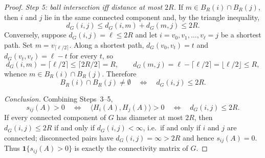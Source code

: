 \documentclass{article}
\begin{document}
\begin{proof}
\emph{Step 5: ball intersection iff distance at most $2R$.}
If $m\in B_R(i)\cap B_R(j)$, then $i$ and $j$ lie in the same connected
component and, by the triangle inequality,
\[
d_G(i,j)\leq d_G(i,m)+d_G(m,j)\leq 2R .
\]
Conversely, suppose $d_G(i,j)=\ell\leq 2R$ and let
$i=v_0,v_1,\dots,v_\ell=j$ be a shortest path. Set
$m=v_{\lceil \ell/2\rceil}$. Along a shortest path,
$d_G(v_0,v_t)=t$ and $d_G(v_t,v_\ell)=\ell-t$ for every $t$, so
\[
d_G(i,m)=\lceil \ell/2\rceil\leq \lceil 2R/2\rceil = R,
\qquad
d_G(m,j)=\ell-\lceil \ell/2\rceil=\lfloor \ell/2\rfloor\leq R,
\]
whence $m\in B_R(i)\cap B_R(j)$. Therefore
\begin{equation}\label{eq:distance_iff}
B_R(i)\cap B_R(j)\neq\emptyset
\quad\Longleftrightarrow\quad
d_G(i,j)\leq 2R .
\end{equation}

\emph{Conclusion.}
Combining Steps~3--5,
\[
s_{ij}(A)>0
\quad\Longleftrightarrow\quad
\langle H_i(A),H_j(A)\rangle>0
\quad\Longleftrightarrow\quad
d_G(i,j)\leq 2R .
\]
If every connected component of $G$ has diameter at most $2R$, then
$d_G(i,j)\leq 2R$ if and only if $d_G(i,j)<\infty$, i.e.\ if and only if
$i$ and $j$ are connected; disconnected pairs have $d_G(i,j)=\infty>2R$
and hence $s_{ij}(A)=0$. Thus $\mathbf{1}\{s_{ij}(A)>0\}$ is exactly the
connectivity matrix of $G$.
\end{proof}
\end{document}
